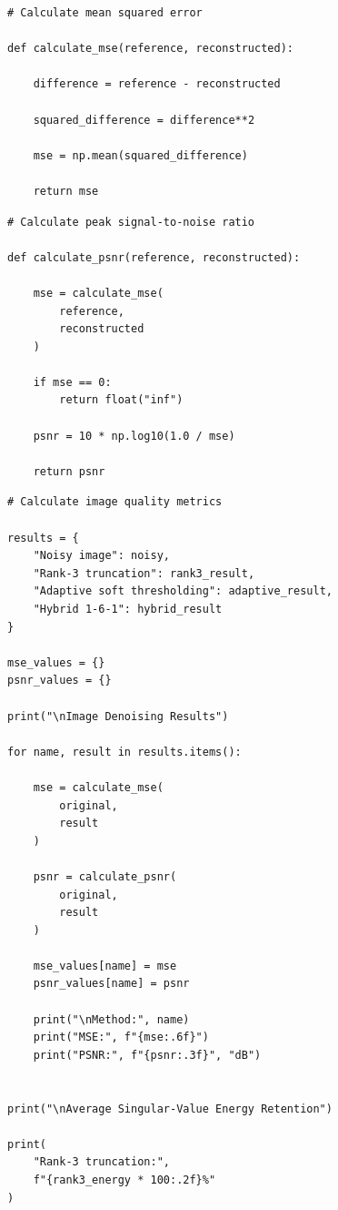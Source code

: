 \documentclass{article}
\begin{document}
\begin{flushleft}
\begin{lstlisting}[caption={Function to calculate the mean squared error (MSE)}]
# Calculate mean squared error

def calculate_mse(reference, reconstructed):

    difference = reference - reconstructed

    squared_difference = difference**2

    mse = np.mean(squared_difference)

    return mse
\end{lstlisting}

\begin{lstlisting}[caption={Function to calculate the peak signal-to-noise ratio (PSNR)}]
# Calculate peak signal-to-noise ratio

def calculate_psnr(reference, reconstructed):

    mse = calculate_mse(
        reference,
        reconstructed
    )

    if mse == 0:
        return float("inf")

    psnr = 10 * np.log10(1.0 / mse)

    return psnr
\end{lstlisting}

\begin{lstlisting}[caption={Calculating and printing MSE, PSNR and energy retention}]
# Calculate image quality metrics

results = {
    "Noisy image": noisy,
    "Rank-3 truncation": rank3_result,
    "Adaptive soft thresholding": adaptive_result,
    "Hybrid 1-6-1": hybrid_result
}

mse_values = {}
psnr_values = {}

print("\nImage Denoising Results")

for name, result in results.items():

    mse = calculate_mse(
        original,
        result
    )

    psnr = calculate_psnr(
        original,
        result
    )

    mse_values[name] = mse
    psnr_values[name] = psnr

    print("\nMethod:", name)
    print("MSE:", f"{mse:.6f}")
    print("PSNR:", f"{psnr:.3f}", "dB")


print("\nAverage Singular-Value Energy Retention")

print(
    "Rank-3 truncation:",
    f"{rank3_energy * 100:.2f}%"
)


\end{lstlisting}
\end{flushleft}
\end{document}
